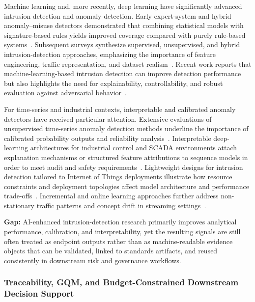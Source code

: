 \documentclass[preprint,12pt]{elsarticle}
\begin{document}
Machine learning and, more recently, deep learning have significantly advanced intrusion detection and anomaly detection. Early expert-system and hybrid anomaly--misuse detectors demonstrated that combining statistical models with signature-based rules yields improved coverage compared with purely rule-based systems~\cite{Depren2005ESWA_IDS}. Subsequent surveys synthesize supervised, unsupervised, and hybrid intrusion-detection approaches, emphasizing the importance of feature engineering, traffic representation, and dataset realism~\cite{Tsai2009_ESWA_Review}. Recent work reports that machine-learning-based intrusion detection can improve detection performance but also highlights the need for explainability, controllability, and robust evaluation against adversarial behavior~\cite{Apruzzese2022}.

For time-series and industrial contexts, interpretable and calibrated anomaly detectors have received particular attention. Extensive evaluations of unsupervised time-series anomaly detection methods underline the importance of calibrated probability outputs and reliability analysis~\cite{Mejri2024_ESWA_TSANOM}. Interpretable deep-learning architectures for industrial control and SCADA environments attach explanation mechanisms or structured feature attributions to sequence models in order to meet audit and safety requirements~\cite{Wadinger2024_ESWA_AID}. Lightweight designs for intrusion detection tailored to Internet of Things deployments illustrate how resource constraints and deployment topologies affect model architecture and performance trade-offs~\cite{Li2024_ESWA_LightIDS}. Incremental and online learning approaches further address non-stationary traffic patterns and concept drift in streaming settings~\cite{Wang2011ESWA_IncSVM}.

\noindent\textbf{Gap:} AI-enhanced intrusion-detection research primarily improves analytical performance, calibration, and interpretability, yet the resulting signals are still often treated as endpoint outputs rather than as machine-readable evidence objects that can be validated, linked to standards artifacts, and reused consistently in downstream risk and governance workflows.

\subsubsection{Traceability, GQM, and Budget-Constrained Downstream Decision Support}
\label{sec:cost-gqm}
\end{document}
